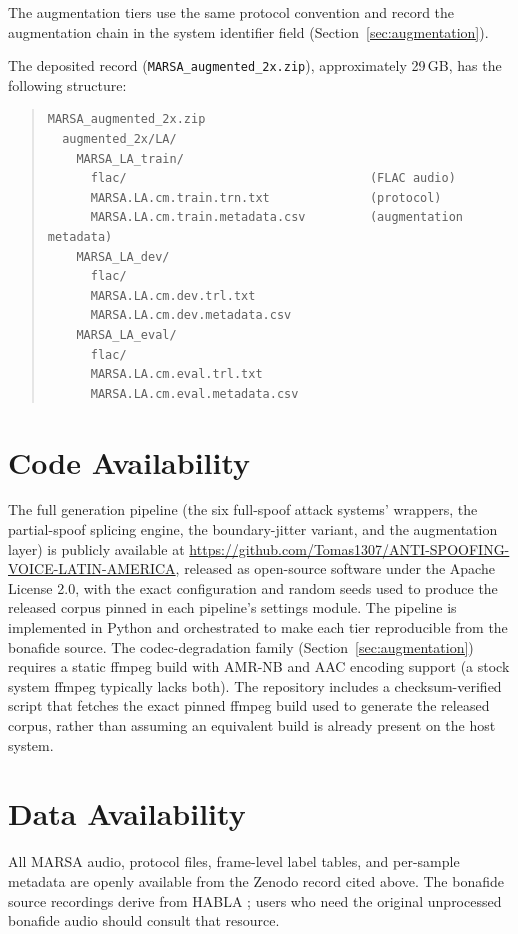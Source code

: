 \documentclass[11pt]{report}
\begin{document}
The augmentation tiers use the same protocol convention
and record the augmentation chain in the system identifier field
(Section~\ref{sec:augmentation}).

The deposited record (\texttt{MARSA\_augmented\_2x.zip}),
approximately 29\,GB, has the following structure:

\begin{quote}\small
\begin{verbatim}
MARSA_augmented_2x.zip
  augmented_2x/LA/
    MARSA_LA_train/
      flac/                                  (FLAC audio)
      MARSA.LA.cm.train.trn.txt              (protocol)
      MARSA.LA.cm.train.metadata.csv         (augmentation metadata)
    MARSA_LA_dev/
      flac/
      MARSA.LA.cm.dev.trl.txt
      MARSA.LA.cm.dev.metadata.csv
    MARSA_LA_eval/
      flac/
      MARSA.LA.cm.eval.trl.txt
      MARSA.LA.cm.eval.metadata.csv
\end{verbatim}
\end{quote}

\section{Code Availability}

The full generation pipeline (the six full-spoof attack systems'
wrappers, the partial-spoof splicing engine, the boundary-jitter
variant, and the augmentation layer) is publicly available at
\url{https://github.com/Tomas1307/ANTI-SPOOFING-VOICE-LATIN-AMERICA},
released as open-source software under the Apache License 2.0, with
the exact configuration and random seeds used to produce the released
corpus pinned in each pipeline's settings module. The pipeline is
implemented in Python and orchestrated to make each tier reproducible
from the bonafide source. The codec-degradation family
(Section~\ref{sec:augmentation}) requires a static ffmpeg build with
AMR-NB and AAC encoding support (a stock system ffmpeg typically lacks
both). The repository includes a checksum-verified script that fetches
the exact pinned ffmpeg build used to generate the released corpus,
rather than assuming an equivalent build is already present on the
host system.

\section{Data Availability}

All MARSA audio, protocol files,
frame-level label tables, and per-sample metadata are openly available
from the Zenodo record cited above. The bonafide source recordings
derive from HABLA \citep{habla}; users who need the original
unprocessed bonafide audio should consult that resource.
\end{document}
